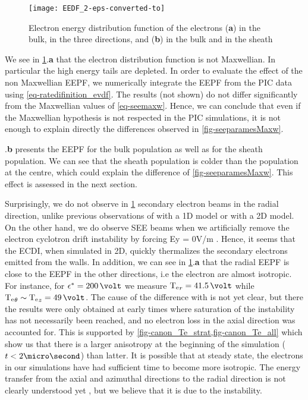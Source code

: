  \begin{figure}[hbtp]
   \centering
   \texttt{[image: EEDF\_2-eps-converted-to]}
   \caption{Electron energy distribution function of the electrons ({\bf a}) in the bulk, in the three directions, and ({\bf b}) in the bulk and in the sheath}
   \label{fig-EEDF}
 \end{figure}
 
 We see in \cref{fig-EEDF}.{\bf a} that the electron distribution function is not Maxwellian.
 In particular the high energy tails are depleted.
 In order to evaluate the effect of the non Maxwellian EEPF, we numerically integrate the EEPF from the PIC data using \vref{eq-ratedifinition_evdf}.
The results (not shown) do not differ significantly from the Maxwellian values of \vref{eq-seemaxw}.
Hence, we can conclude that even if the Maxwellian hypothesis is not respected in the PIC simulations, it is not enough to explain directly the differences observed in \vref{fig-seeparamesMaxw}.


.{\bf b} presents the EEPF for the bulk population as well as for the sheath population.
 We can see that the sheath population is colder than the population at the centre, which could explain the difference of \vref{fig-seeparamesMaxw}. 
 This effect is assessed in the next section.

 Surprisingly, we do not observe in \cref{fig-EEDF} secondary electron beams in the radial  direction, unlike previous observations of \citet{sydorenko2006} with a 1D model or \citet{heron2013} with a 2D model.
 On the other hand, we do observe SEE beams when  we artificially remove the electron cyclotron drift instability by forcing Ey = 0V/m \citep{croes2017}.
 Hence, it seems that the ECDI, when simulated in 2D, quickly thermalizes the secondary electrons emitted from the walls.
 In addition, we can see in \cref{fig-EEDF}.{\bf a} that the radial EEPF is close to the EEPF in the other directions, i.e the electron are almost isotropic.
 For instance, for $\crover = 200\,\volt$  we measure $\Te_r = 41.5\,\volt$ while $\Te_{\theta} \sim \Te_z = 49\,\volt$.
 The cause of the difference with \citet{heron2013} is not yet clear, but there the results were only obtained at early times where saturation of the instability has not necessarily been reached, and no electron loss in  the axial direction was accounted for.
 This is supported by \cref{fig-canon_Te_strat,fig-canon_Te_all} which show us that there is a larger anisotropy at the beginning of the simulation ($t<2\micro\second$) than latter.
 It is possible that at steady state, the electrons in our simulations have had sufficient time to become more isotropic.
 The energy transfer from the axial and azimuthal directions to the radial direction is not clearly understood
 yet \citep{janhunen2018}, but we believe that it is due to the instability.



